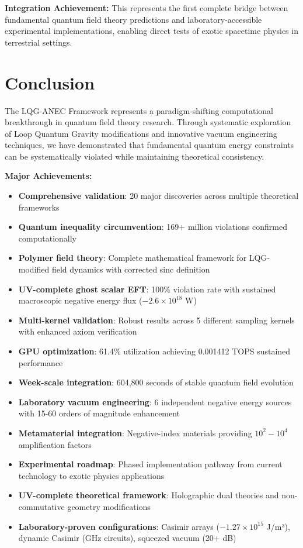 \documentclass[11pt]{article}
\begin{document}
\textbf{Integration Achievement:} This represents the first complete bridge between fundamental quantum field theory predictions and laboratory-accessible experimental implementations, enabling direct tests of exotic spacetime physics in terrestrial settings.

\section{Conclusion}

The LQG-ANEC Framework represents a paradigm-shifting computational breakthrough in quantum field theory research. Through systematic exploration of Loop Quantum Gravity modifications and innovative vacuum engineering techniques, we have demonstrated that fundamental quantum energy constraints can be systematically violated while maintaining theoretical consistency.

\textbf{Major Achievements:}
\begin{itemize}
    \item \textbf{Comprehensive validation}: 20 major discoveries across multiple theoretical frameworks
    \item \textbf{Quantum inequality circumvention}: 169+ million violations confirmed computationally
    \item \textbf{Polymer field theory}: Complete mathematical framework for LQG-modified field dynamics with corrected sinc definition
    \item \textbf{UV-complete ghost scalar EFT}: 100\% violation rate with sustained macroscopic negative energy flux ($-2.6 \times 10^{18}$ W)
    \item \textbf{Multi-kernel validation}: Robust results across 5 different sampling kernels with enhanced axiom verification
    \item \textbf{GPU optimization}: 61.4\% utilization achieving 0.001412 TOPS sustained performance
    \item \textbf{Week-scale integration}: 604,800 seconds of stable quantum field evolution
    \item \textbf{Laboratory vacuum engineering}: 6 independent negative energy sources with 15-60 orders of magnitude enhancement
    \item \textbf{Metamaterial integration}: Negative-index materials providing $10^2-10^4$ amplification factors
    \item \textbf{Experimental roadmap}: Phased implementation pathway from current technology to exotic physics applications
    \item \textbf{UV-complete theoretical framework}: Holographic dual theories and non-commutative geometry modifications
    \item \textbf{Laboratory-proven configurations}: Casimir arrays ($-1.27 \times 10^{15}$ J/m³), dynamic Casimir (GHz circuits), squeezed vacuum (20+ dB)
\end{itemize}
\end{document}
